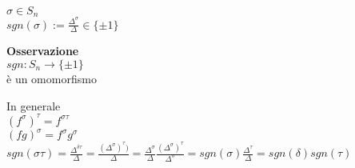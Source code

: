 \documentclass[12px]{article}
\begin{document}
	\begin{defi}
		$\sigma\in S_n$\\
		$sgn(\sigma) := \frac {\Delta^\sigma}\Delta\in\{\pm 1\}$\\
	\end{defi}
		 \textbf{Osservazione}\\
		 $sgn: S_n \rightarrow \{\pm 1\}$ \\
		 è un omomorfismo\\
		 \begin{dimo}
		 	In generale\\
			$(f^\sigma)^\tau = f^{\sigma\tau}$\\
			 $(fg)^\sigma = f^\sigma g^\sigma$\\
			 $\displaystyle sgn(\sigma\tau)=\frac {\Delta^{\delta\tau}}\Delta = \frac {(\Delta^\sigma)^\tau)} \Delta = \frac {\Delta^\sigma}{\Delta} \frac {(\Delta^\sigma)^\tau}{\Delta^\sigma} = sgn(\sigma)\frac{\Delta^\tau}\Delta = sgn(\delta)sgn(\tau)$
		 \end{dimo}




	 
\end{document}
